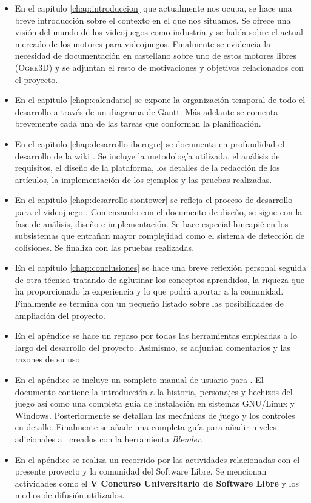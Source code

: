 \begin{itemize}
    \item En el capítulo \ref{chap:introduccion} que actualmente nos ocupa,
    se hace una breve introducción sobre el contexto en el que nos situamos.
    Se ofrece una visión del mundo de los videojuegos como industria y se
    habla sobre el actual mercado de los motores para videojuegos.
    Finalmente se evidencia la necesidad de documentación en castellano
    sobre uno de estos motores libres (\textsc{Ogre3D}) y se adjuntan el
    resto de motivaciones y objetivos relacionados con el proyecto.
    \item En el capítulo \ref{chap:calendario} se expone la organización
    temporal de todo el desarrollo a través de un diagrama de Gantt. Más 
    adelante se comenta brevemente cada una de las tareas que conforman
    la planificación.
    \item En el capítulo \ref{chap:desarrollo-iberogre} se documenta
    en profundidad el desarrollo de la wiki \wiki. Se incluye la metodología
    utilizada, el análisis de requisitos, el diseño de la plataforma, los
    detalles de la redacción de los artículos, la implementación de los
    ejemplos y las pruebas realizadas.
    \item En el capítulo \ref{chap:desarrollo-siontower} se refleja el proceso
    de desarrollo para el videojuego \juego. Comenzando con el documento
    de diseño, se sigue con la fase de análisis, diseño e implementación.
    Se hace especial hincapié en los subsistemas que entrañan mayor complejidad
    como el sistema de detección de colisiones. Se finaliza con las pruebas
    realizadas.
    \item En el capítulo \ref{chap:conclusiones} se hace una breve reflexión
    personal seguida de otra técnica tratando de aglutinar los conceptos
    aprendidos, la riqueza que ha proporcionado la experiencia y lo que
    podrá aportar a la comunidad. Finalmente se termina con un pequeño
    listado sobre las posibilidades de ampliación del proyecto.
    \item En el apéndice  se hace un repaso por todas
    las herramientas empleadas a lo largo del desarrollo
    del proyecto. Asimismo, se adjuntan comentarios y las razones de su uso.
    \item En el apéndice  se incluye un completo manual
    de usuario para \juego. El documento contiene la introducción a la historia,
    personajes y hechizos del juego así como una completa guía de instalación
    en sistemas GNU/Linux y Windows. Posteriormente se detallan las mecánicas
    de juego y los controles en detalle. Finalmente se añade una completa guía
    para añadir niveles adicionales a \juego\ creados con la herramienta
    \textit{Blender}.
    \item En el apéndice  se realiza un recorrido
    por las actividades relacionadas con el presente proyecto y la
    comunidad del Software Libre. Se mencionan actividades como el
    \textbf{V Concurso Universitario de Software Libre} y los medios de difusión
    utilizados.
\end{itemize}
